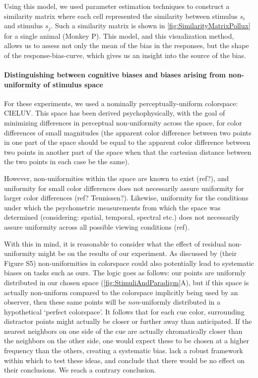 Using this model, we used parameter estimation techniques to construct a similarity matrix where each cell represented the similarity between stimulus $s_i$ and stimulus $s_j$. 
Such a similarity matrix is shown in \autoref{fig:SimilarityMatrixPollux} for a single animal (Monkey P).
This model, and this visualization method, allows us to assess not only the mean of the bias in the responses, but the shape of the response-bias-curve, which gives us an insight into the source of the bias.

\paragraph{Distinguishing between cognitive biases and biases arising from non-uniformity of stimulus space}

For these experiments, we used a nominally perceptually-uniform colorspace: CIELUV. 
This space has been derived psychophysically, with the goal of minimizing differences in perceptual non-uniformity across the space, for color differences of small magnitudes (the apparent color difference between two points in one part of the space should be equal to the apparent color difference between two points in another part of the space when that the cartesian distance between the two points in each case be the same).

However, non-uniformities within the space are known to exist (ref?), and uniformity for small color differences does not necessarily assure uniformity for larger color differences (ref? Teunissen?). %
Likewise, uniformity for the conditions under which the psychometric measurements from which the space was determined (considering: spatial, temporal, spectral etc.) does not necessarily assure uniformity across all possible viewing conditions (ref).

With this in mind, it is reasonable to consider what the effect of residual non-uniformity might be on the results of our experiment. 
As discussed by \cite{panichello_error-correcting_2019} (their Figure S5) non-uniformities in colorspace could also potentially lead to systematic biases on tasks such as ours. %
The logic goes as follows: our points are uniformly distributed in our chosen space (\autoref{fig:StimuliAndParadigm}A), but if this space is actually non-uniform compared to the colorspace implicitly being used by an observer, then these same points will be \emph{non}-uniformly distributed in a hypothetical `perfect colorspace'. 
It follows that for each cue color, surrounding distractor points might actually be closer or further away than anticipated. 
If the nearest neighbors on one side of the cue are actually chromatically closer than the neighbors on the other side, one would expect these to be chosen at a higher frequency than the others, creating a systematic bias.
\cite{panichello_error-correcting_2019} lack a robust framework within which to test these ideas, and conclude that there would be no effect on their conclusions. We reach a contrary conclusion.

